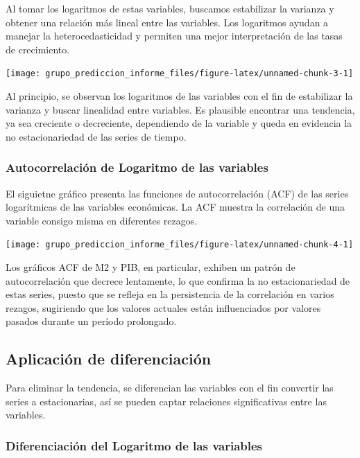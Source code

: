 \documentclass[
  12pt,
]{article}
\begin{document}
Al tomar los logaritmos de estas variables, buscamos estabilizar la
varianza y obtener una relación más lineal entre las variables. Los
logaritmos ayudan a manejar la heterocedasticidad y permiten una mejor
interpretación de las tasas de crecimiento.

\begin{center}\texttt{[image: grupo\_prediccion\_informe\_files/figure-latex/unnamed-chunk-3-1]} \end{center}

Al principio, se observan los logaritmos de las variables con el fin de
estabilizar la varianza y buscar linealidad entre variables. Es
plausible encontrar una tendencia, ya sea creciente o decreciente,
dependiendo de la variable y queda en evidencia la no estacionariedad de
las series de tiempo.

\subsubsection{Autocorrelación de Logaritmo de las
variables}\label{autocorrelaciuxf3n-de-logaritmo-de-las-variables}

El siguietne gráfico presenta las funciones de autocorrelación (ACF) de
las series logarítmicas de las variables económicas. La ACF muestra la
correlación de una variable consigo misma en diferentes rezagos.

\begin{center}\texttt{[image: grupo\_prediccion\_informe\_files/figure-latex/unnamed-chunk-4-1]} \end{center}

Los gráficos ACF de M2 y PIB, en particular, exhiben un patrón de
autocorrelación que decrece lentamente, lo que confirma la no
estacionariedad de estas series, puesto que se refleja en la
persistencia de la correlación en varios rezagos, sugiriendo que los
valores actuales están influenciados por valores pasados durante un
período prolongado.

\subsection{Aplicación de
diferenciación}\label{aplicaciuxf3n-de-diferenciaciuxf3n}

Para eliminar la tendencia, se diferencian las variables con el fin
convertir las series a estacionarias, así se pueden captar relaciones
significativas entre las variables.

\subsubsection{Diferenciación del Logaritmo de las
variables}\label{diferenciaciuxf3n-del-logaritmo-de-las-variables}
\end{document}
